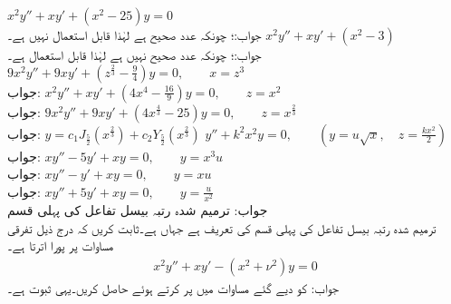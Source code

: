 \quad
$x^2y''+xy'+(x^2-25)y=0$\\
جواب:؛ چونکہ  عدد صحیح ہے لہٰذا  قابل استعمال نہیں ہے۔
\quad
$x^2y''+xy'+(x^2-3)$\\
جواب:؛ چونکہ  عدد صحیح نہیں ہے لہٰذا  قابل استعمال ہے۔
\quad
$9x^2y''+9xy'+(z^{\tfrac{2}{3}}-\tfrac{9}{4})y=0, \quad \quad x=z^3$\\
جواب:
\quad
$x^2y''+xy'+(4x^4-\tfrac{16}{9})y=0,\quad \quad z=x^2$\\
جواب:
\quad
$9x^2y''+9xy'+(4x^{\tfrac{4}{3}}-25)y=0,\quad \quad z=x^{\tfrac{2}{3}}$\\
جواب:
$y=c_1J_{\tfrac{5}{2}}(x^{\tfrac{2}{3}})+c_2Y_{\tfrac{5}{2}}(x^{\tfrac{2}{3}})$
\quad
$y''+k^2x^2y=0,\quad \quad (y=u\sqrt{x},\quad z=\tfrac{kx^2}{2})$\\
جواب:
\quad
$xy''-5y'+xy=0,\quad \quad y=x^3u$\\
جواب:
\quad
$xy''-y'+xy=0,\quad \quad y=xu$\\
جواب:
\quad
$xy''+5y'+xy=0,\quad \quad y=\tfrac{u}{x^2}$\\
جواب:
\quad ترمیم شدہ رتبہ  بیسل تفاعل کی پہلی قسم\\
ترمیم شدہ رتبہ  بیسل تفاعل کی پہلی قسم کی تعریف  ہے جہاں  ہے۔ثابت کریں  کہ  درج ذیل تفرقی مساوات پر پورا اترتا ہے۔
\begin{align}\label{مساوت_بیسل_ترمیم_شدہ}
x^2y''+xy'-(x^2+\nu^2)y=0
\end{align}
جواب: کو دیے گئے مساوات میں پر کرتے ہوئے  حاصل کریں۔یہی ثبوت ہے۔
